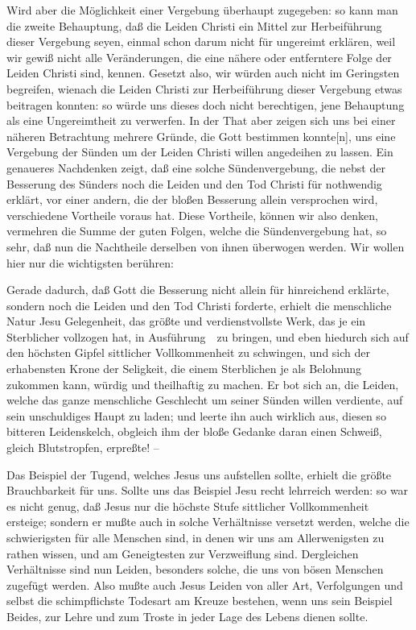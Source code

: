 \begin{aufza}
\begin{aufzb}
\item Wird aber die Möglichkeit einer Vergebung überhaupt zugegeben: so kann man die zweite Behauptung, daß die Leiden Christi ein Mittel zur Herbeiführung dieser Vergebung seyen, einmal schon darum nicht für ungereimt erklären, weil wir gewiß nicht alle Veränderungen, die eine nähere oder entferntere Folge der Leiden Christi sind, kennen. Gesetzt also, wir würden auch nicht im Geringsten begreifen, wienach die Leiden Christi zur Herbeiführung dieser Vergebung etwas beitragen konnten: so würde uns dieses doch nicht berechtigen, jene Behauptung als eine Ungereimtheit zu verwerfen. In der That aber zeigen sich uns bei einer näheren Betrachtung mehrere Gründe, die Gott bestimmen konnte[n], uns eine Vergebung der Sünden um der Leiden Christi willen angedeihen zu lassen. Ein genaueres Nachdenken zeigt, daß eine solche Sündenvergebung, die nebst der Besserung des Sünders noch die Leiden und den Tod Christi für nothwendig erklärt, vor einer andern, die der bloßen Besserung allein versprochen wird, verschiedene Vortheile voraus hat. Diese Vortheile, können wir also denken, vermehren die Summe der guten Folgen, welche die Sündenvergebung hat, so sehr, daß nun die Nachtheile derselben von ihnen überwogen werden. Wir wollen hier nur die wichtigsten berühren:
\begin{aufzc}
\item Gerade dadurch, daß Gott die Besserung nicht allein für hinreichend erklärte, sondern noch die Leiden und den Tod Christi forderte, erhielt die menschliche Natur Jesu Gelegenheit, das größte und verdienstvollste Werk, das je ein Sterblicher vollzogen hat, in Ausführung~\ zu bringen, und eben hiedurch sich auf den höchsten Gipfel sittlicher Vollkommenheit zu schwingen, und sich der erhabensten Krone der Seligkeit, die einem Sterblichen je als Belohnung zukommen kann, würdig und theilhaftig zu machen. Er bot sich an, die Leiden, welche das ganze menschliche Geschlecht um seiner Sünden willen verdiente, auf sein unschuldiges Haupt zu laden; und leerte ihn auch wirklich aus, diesen so bitteren Leidenskelch, obgleich ihm der bloße Gedanke daran einen Schweiß, gleich Blutstropfen, erpreßte! -- 
\item Das Beispiel der Tugend, welches Jesus uns aufstellen sollte, erhielt die größte Brauchbarkeit für uns. Sollte uns das Beispiel Jesu recht lehrreich werden: so war es nicht genug, daß Jesus nur die höchste Stufe sittlicher Vollkommenheit ersteige; sondern er mußte auch in solche Verhältnisse versetzt werden, welche die schwierigsten für alle Menschen sind, in denen wir uns am Allerwenigsten zu rathen wissen, und am Geneigtesten zur Verzweiflung sind. Dergleichen Verhältnisse sind nun Leiden, besonders solche, die uns von bösen Menschen zugefügt werden. Also mußte auch Jesus Leiden von aller Art, Verfolgungen und selbst die schimpflichste Todesart am Kreuze bestehen, wenn uns sein Beispiel Beides, zur Lehre und zum Troste in jeder Lage des Lebens dienen sollte.

\end{aufzc}
\end{aufzb}
\end{aufza}
